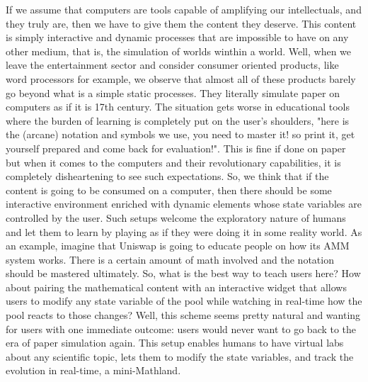 \documentclass[12pt, a4paper]{article}
\begin{document}
If we assume that computers are tools capable of amplifying our intellectuals, and they truly are, then we have to give them the content they deserve. This content is simply interactive and dynamic processes that are impossible to have on any other medium, that is, the simulation of worlds winthin a world. Well, when we leave the entertainment sector and consider consumer oriented products, like word processors for example, we observe that almost all of these products barely go beyond what is a simple static processes. They literally simulate paper on computers as if it is 17th century. The situation gets worse in educational tools where the  burden of learning is completely put on the user’s shoulders, "here is the (arcane) notation and symbols we use, you need to master it! so print it, get yourself prepared and come back for evaluation!". This is fine if done on paper but when it comes to the computers and their revolutionary capabilities, it is completely disheartening to see such expectations. So, we think that if the content is going to be consumed on a computer, then there should be some interactive environment enriched with dynamic elements whose state variables are controlled by the user. Such setups welcome the exploratory nature of humans and let them to learn by playing as if they were doing it in some reality world. As an example, imagine that Uniswap is going to educate people on how its AMM system works. There is a certain amount of math involved and the notation should be mastered ultimately. So, what is the best way to teach users here? How about pairing the mathematical content with an interactive widget that allows users to modify any state variable of the pool while watching in real-time how the pool reacts to those changes? Well, this scheme seems pretty natural and wanting for users with one immediate outcome: users would never want to go back to the era of paper simulation again. This setup enables humans to have virtual labs about any scientific topic, lets them to modify the state variables, and track the evolution in real-time, a mini-Mathland\cite{papert}.
\end{document}
